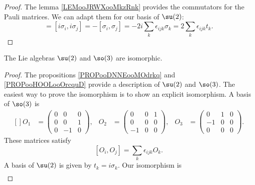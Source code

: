 \begin{proof}
    The lemma \ref{LEMooJRWXooMkzRnk} provides the commutators for the Pauli matrices. We can adapt them for our basis of \( \su(2)\):
    \begin{equation}
        [t_i,t_j]=[i\sigma_i , i\sigma_j ]=-[\sigma_i,\sigma_j]=-2i\sum_k\epsilon_{ijk}\sigma_k=2\sum_k\epsilon_{ijk}t_k.
    \end{equation}
\end{proof}

\begin{proposition}
    The Lie algebras \( \su(2)\) and \( \so(3)\) are isomorphic.
\end{proposition}

\begin{proof}
    The propositions \ref{PROPooDNNEooMOdrkq} and \ref{PROPooHOOLooOrcquD} provide a description of \( \su(2)\) and \( \so(3)\). The easiest way to prove the isomorphism is to show an explicit isomorphism. A basis of \( \so(3)\) is
    \begin{equation}
        \begin{aligned}[]
            O_1&=\begin{pmatrix}
                0    &   0    &   0    \\
                0    &   0    &   1    \\
                0    &   -1    &   0
            \end{pmatrix},&O_2&=\begin{pmatrix}
                0    &   0    &   1    \\
                0    &   0    &   0    \\
                -1    &   0    &   0
            \end{pmatrix},&O_3&=\begin{pmatrix}
                0    &   1    &   0    \\
                -1    &   0    &   0    \\
                0    &   0    &   0
            \end{pmatrix}.
        \end{aligned}
    \end{equation}
    These matrices satisfy
    \begin{equation}        \label{EQooWJMUooOtFAkW}
        [O_i,O_j]=\sum_k\epsilon_{ijk}O_k.
    \end{equation}
    A basis of \( \su(2)\) is given by \( t_k=i\sigma_k\). Our isomorphism is
    \begin{equation}
        \begin{aligned}

\end{aligned}
\end{equation}
\end{proof}

